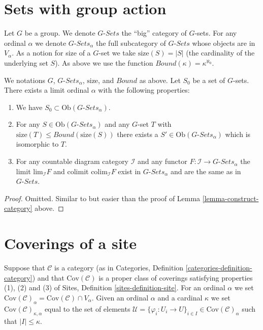 \section{Sets with group action}
\label{section-sets-with-group-action}

\noindent
Let $G$ be a group. We denote $G\textit{-Sets}$ the ``big'' category
of $G$-sets. For any ordinal $\alpha$ we denote
$G\textit{-Sets}_\alpha$ the full subcategory of $G\textit{-Sets}$
whose objects are in $V_\alpha$. As a notion for size of a $G$-set
we take $\text{size}(S) = |S|$ (the cardinality of the underlying
set $S$). As above we use the function $Bound(\kappa) = \kappa^{\aleph_0}$.

\begin{lemma}
\label{lemma-sets-with-group-action}
We notations $G$, $G\textit{-Sets}_\alpha$, $\text{size}$,
and $Bound$ as above. Let $S_0$ be a set of $G$-sets.
There exists a limit ordinal $\alpha$ with the following properties:
\begin{enumerate}
\item We have $S_0 \subset \text{Ob}(G\textit{-Sets}_\alpha)$.
\item For any $S \in \text{Ob}(G\textit{-Sets}_\alpha)$ and any
$G$-set $T$ with $\text{size}(T) \leq Bound(\text{size}(S))$
there exists a $S' \in \text{Ob}(G\textit{-Sets}_\alpha)$
which is isomorphic to $T$.
\item For any countable diagram category $\mathcal{I}$ and
any functor $F : \mathcal{I} \to G\textit{-Sets}_\alpha$ the
limit $\text{lim}_{\mathcal{I}} F$ and colimit
$\text{colim}_\mathcal{I} F$ exist in $G\textit{-Sets}_\alpha$
and are the same as in $G\textit{-Sets}$.
\end{enumerate}
\end{lemma}

\begin{proof}
Omitted. Similar to but easier than the proof of
Lemma \ref{lemma-construct-category} above.
\end{proof}

\section{Coverings of a site}
\label{section-coverings-site}

\noindent
Suppose that $\mathcal{C}$ is a category (as in
Categories, Definition \ref{categories-definition-category}) and
that $\text{Cov}(\mathcal{C})$ is a proper class of coverings
satisfying properties (1), (2) and (3) of Sites,
Definition \ref{sites-definition-site}.
For an ordinal $\alpha$ we set
$\text{Cov}(\mathcal{C})_\alpha = \text{Cov}(\mathcal{C}) \cap V_\alpha$.
Given an ordinal $\alpha$ and a cardinal $\kappa$ we set
$\text{Cov}(\mathcal{C})_{\kappa, \alpha}$ equal to the set
of elements
$\mathcal{U} =
\{\varphi_i : U_i \to U\}_{i\in I} \in \text{Cov}(\mathcal{C})_\alpha$
such that $|I| \leq \kappa$.

